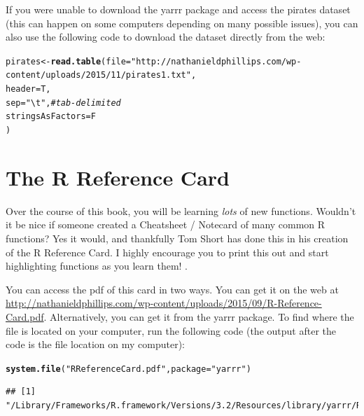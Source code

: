 \documentclass{tufte-book}\usepackage[]{graphicx}\usepackage[]{color}
\makeatletter
\newcommand{\hlstr}[1]{\textcolor[rgb]{0.192,0.494,0.8}{#1}}%
\newcommand{\hlcom}[1]{\textcolor[rgb]{0.678,0.584,0.686}{\textit{#1}}}%
\newcommand{\hlstd}[1]{\textcolor[rgb]{0.345,0.345,0.345}{#1}}%
\newcommand{\hlkwb}[1]{\textcolor[rgb]{0.69,0.353,0.396}{#1}}%
\newcommand{\hlkwc}[1]{\textcolor[rgb]{0.333,0.667,0.333}{#1}}%
\newcommand{\hlkwd}[1]{\textcolor[rgb]{0.737,0.353,0.396}{\textbf{#1}}}%
\newenvironment{kframe}{%
 \def\at@end@of@kframe{}%
 \ifinner\ifhmode%
  \def\at@end@of@kframe{\end{minipage}}%
  \begin{minipage}{\columnwidth}%
 \fi\fi%
 \def\FrameCommand##1{\hskip\@totalleftmargin \hskip-\fboxsep
 \colorbox{shadecolor}{##1}\hskip-\fboxsep
     \hskip-\linewidth \hskip-\@totalleftmargin \hskip\columnwidth}%
 \MakeFramed {\advance\hsize-\width
   \@totalleftmargin\z@ \linewidth\hsize
   \@setminipage}}%
 {\par\unskip\endMakeFramed%
 \at@end@of@kframe}
\newenvironment{knitrout}{}{} %
\makeatother
\begin{document}
If you were unable to download the yarrr package and access the pirates dataset (this can happen on some computers depending on many possible issues), you can also use the following code to download the dataset directly from the web:

\begin{footnotesize}
\begin{knitrout}
\color{fgcolor}\begin{kframe}
\begin{alltt}
\hlstd{pirates} \hlkwb{<-} \hlkwd{read.table}\hlstd{(}\hlkwc{file} \hlstd{=} \hlstr{"http://nathanieldphillips.com/wp-content/uploads/2015/11/pirates1.txt"}\hlstd{,}
                      \hlkwc{header} \hlstd{= T,}
                      \hlkwc{sep} \hlstd{=} \hlstr{"\textbackslash{}t"}\hlstd{,} \hlcom{# tab-delimited}
                      \hlkwc{stringsAsFactors} \hlstd{= F}
                      \hlstd{)}
\end{alltt}
\end{kframe}
\end{knitrout}
\end{footnotesize}




\section{The R Reference Card}

Over the course of this book, you will be learning \textit{lots} of new functions. Wouldn't it be nice if someone created a Cheatsheet / Notecard of many common R functions? Yes it would, and thankfully Tom Short has done this in his creation of the R Reference Card. I highly encourage you to print this out and start highlighting functions as you learn them!
.

You can access the pdf of this card in two ways. You can get it on the web at \textcolor{blue}{\href{<http://nathanieldphillips.com/wp-content/uploads/2015/09/R-Reference-Card.pdf>}{http://nathanieldphillips.com/wp-content/uploads/2015/09/R-Reference-Card.pdf}}. Alternatively, you can get it from the yarrr package. To find where the file is located on your computer, run the following code (the output after the code is the file location on my computer):

\begin{knitrout}
\color{fgcolor}\begin{kframe}
\begin{alltt}
\hlkwd{system.file}\hlstd{(}\hlstr{"RReferenceCard.pdf"}\hlstd{,} \hlkwc{package}\hlstd{=}\hlstr{"yarrr"}\hlstd{)}
\end{alltt}
\begin{verbatim}
## [1] "/Library/Frameworks/R.framework/Versions/3.2/Resources/library/yarrr/RReferenceCard.pdf"
\end{verbatim}
\end{kframe}
\end{knitrout}
\end{document}
